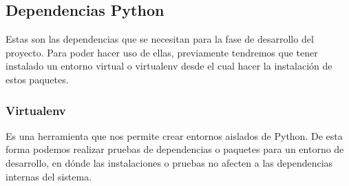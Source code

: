 \subsection{Dependencias Python}

Estas son las dependencias que se necesitan para la fase de desarrollo del proyecto. Para poder hacer uso de ellas, previamente tendremos que tener instalado un entorno virtual o virtualenv desde el cual hacer la instalación de estos paquetes.

\subsubsection{Virtualenv}

Es una herramienta que nos permite crear entornos aislados de Python. De esta forma podemos realizar pruebas de dependencias o paquetes para un entorno de desarrollo, en dónde las instalaciones o pruebas no afecten a las dependencias internas del sistema.\\

